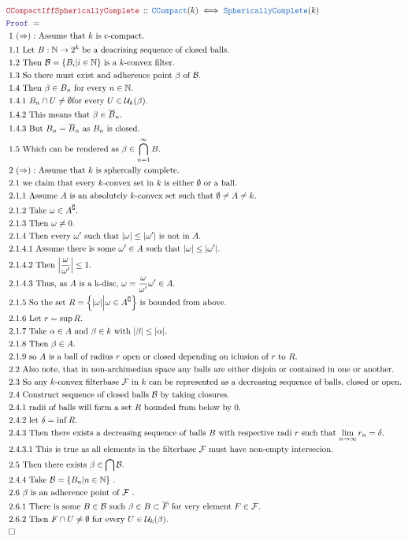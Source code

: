 \documentclass[12pt]{scrartcl}
\newcommand{\TYPE}[1]{\textcolor{NavyBlue}{\mathtt{#1}}}
\newcommand{\LOGIC}[1]{\textcolor{Blue}{\mathtt{#1}}}
\newcommand{\THM}[1]{\textcolor{Maroon}{\mathtt{#1}}}
\renewcommand{\.}{\; . \;}
\newcommand{\Theorem}[2]{& \THM{#1} \, :: \, #2 \\ & \Proof = \\ }
\newcommand{\Page}[1]{ \begin{align*} #1 \end{align*}   }
\newcommand{\Explain}[1]{& \text{#1.} \\}
\newcommand{\Nat}{\mathbb{N} }
\renewcommand{\c}{\complement}
\newcommand{\QED}{\; \square}
\newcommand{\EndProof}{& \QED \\}
\newcommand{\Proof}{\LOGIC{Proof} \; }
\newcommand{\B}{\mathcal{B}}
\renewcommand{\U}{\mathcal{U}}
\newcommand{\F}{\mathcal{F}}
\newcommand{\CCompact}{\TYPE{CCompact}}
\begin{document}
{}\Page{
	\Theorem{CCompactIffSphericallyComplete}
	{
		\CCompact(k) \iff \TYPE{SphericallyComplete}(k)
	}
	\Explain{ 1 $(\Rightarrow):$ Assume that $k$ is c-compact}
	\Explain{ 1.1 Let $B:\Nat \to 2^k$ be a deacrising sequence of closed balls}
	\Explain{ 1.2 Then $\B =\{B_i | i \in \Nat\}$ is a $k$-convex filter}
	\Explain{ 1.3 So there must exist and adherence point $\beta$ of $\B$}
	\Explain{ 1.4 Then $\beta \in B_n$ for every $n \in \Nat$}
	\Explain{ 1.4.1 $B_n \cap U \neq \emptyset$for every $U \in \U_k(\beta)$}
	\Explain{ 1.4.2 This means that $\beta \in \overline{B}_n$}
	\Explain{ 1.4.3 But $B_n = \overline{B}_n$ as $B_n$ is closed}
	\Explain{ 1.5 Which can be rendered as $\beta \in \bigcap^\infty_{n=1} B$}
	\Explain{ 2  $(\Rightarrow):$ Assume that $k$ is sphercally complete}
	\Explain{ 2.1  we claim that every $k$-convex set in $k$ is either 
		$\emptyset$ or a ball}
	\Explain{ 2.1.1 Assume $A$ is an absolutely $k$-convex set such that 
		$\emptyset \neq A \neq k$}
	\Explain{ 2.1.2 Take $\omega \in A^\c$}
	\Explain{ 2.1.3 Then $\omega \neq 0$}
	\Explain{ 2.1.4 Then every $\omega'$ such that $|\omega| \le |\omega'|$ is not in $A$} 
	\Explain{ 2.1.4.1 Assume there is some $\omega' \in A$ such that $|\omega| \le |\omega'|$}
	\Explain{ 2.1.4.2 Then $\left| \frac{\omega}{\omega'}\right| \le 1$}	
	\Explain{ 2.1.4.3 Thus, as $A$ is a k-disc, $\omega = \frac{\omega}{\omega'}\omega' \in A$}
	\Explain{ 2.1.5 So the set $R = \Big\{ |\omega| \Big| \omega \in A^\c\Big\}$
		is bounded from above} 
	\Explain{ 2.1.6 Let $r = \sup R$}
	\Explain{ 2.1.7 Take $\alpha \in A$ and $\beta \in k$ with $|\beta| \le |\alpha|$}
	\Explain{ 2.1.8 Then $\beta \in A$}
	\Explain{ 2.1.9 so $A$ is a ball of radius $r$ open or closed depending on iclusion of $r$ to $R$}
	\Explain{ 2.2 Also note, 
		that in non-archimedian space any balls are either disjoin or contained in one or another}
	\Explain{
		2.3 So any $k$-convex filterbase $\F$ in $k$ can be represented as 
		a decreasing sequence of balls, closed or open}
	\Explain{
		2.4 Construct sequence of closed balls $\B$ by taking closures}
	\Explain{
		2.4.1 radii of balls will form a set $R$ bounded from below by $0$}
	\Explain{
		2.4.2 let $\delta = \inf R$}
	\Explain{
		2.4.3 Then there exists a decreasing sequence of balls $B$ with respective radi $r$
		such that $\lim_{n\to\infty} r_n = \delta$}
	\Explain{
		2.4.3.1 This is true as all elements in the filterbase $\F$ must have non-empty intersecion}
	\Explain{
		2.5 Then there exists $\beta \in \bigcap \B$}
	\Explain{
		2.4.4 Take $\B = \{ B_n | n \in \Nat\}$
	}
	\Explain{
		2.6 $\beta$ is an adherence point of $\F$
	}
	\Explain{
		2.6.1 There is some $B \in \B$ such $\beta \in B \subset \overline{F}$ for very element $F \in \F$}
	\Explain{
		2.6.2 Then $F \cap U \neq \emptyset$ for every $U \in \U_k(\beta)$}
	\EndProof
}
\newpage
\end{document}
